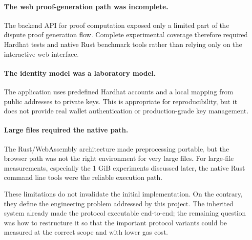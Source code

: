 \paragraph{The web proof-generation path was incomplete.}
The backend API for proof computation exposed only a limited part of the dispute proof
generation flow. Complete experimental coverage therefore required Hardhat tests and native
Rust benchmark tools rather than relying only on the interactive web interface.

\paragraph{The identity model was a laboratory model.}
The application uses predefined Hardhat accounts and a local mapping from public addresses to
private keys. This is appropriate for reproducibility, but it does not provide real wallet
authentication or production-grade key management.

\paragraph{Large files required the native path.}
The Rust/WebAssembly architecture made preprocessing portable, but the browser path was not
the right environment for very large files. For large-file measurements, especially the 1 GiB
experiments discussed later, the native Rust command line tools were the reliable execution
path.

These limitations do not invalidate the initial implementation. On the contrary, they define
the engineering problem addressed by this project. The inherited system already made the
protocol executable end-to-end; the remaining question was how to restructure it so that the
important protocol variants could be measured at the correct scope and with lower gas cost.

